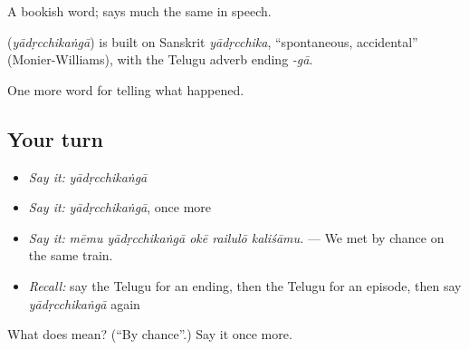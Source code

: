 A bookish word;  says much the same in speech.

\begin{cousinweb}
\textbf{} (\emph{yādṛcchikaṅgā}) is built on Sanskrit \emph{yādṛcchika}, \textquotedblleft{}spontaneous, accidental\textquotedblright{} (Monier-Williams), with the Telugu adverb ending \emph{-gā}.
\end{cousinweb}

\begin{grammarlens}[title={What you've built}]
One more word for telling what happened.
\end{grammarlens}

\subsection*{Your turn}
\begin{itemize}
\raggedright
  \item \emph{Say it:} \emph{yādṛcchikaṅgā}
  \item \emph{Say it:} \emph{yādṛcchikaṅgā}, once more
  \item \emph{Say it:} \emph{mēmu yādṛcchikaṅgā okē railulō kaliśāmu.} — We met by chance on the same train.
  \item \emph{Recall:} say the Telugu for an ending, then the Telugu for an episode, then say \emph{yādṛcchikaṅgā} again
\end{itemize}

\begin{tcolorbox}[breakable,colback=teal!4,colframe=teal!35!black,title={Before you move on}]
What does  mean? (\textquotedblleft{}By chance\textquotedblright{}.) Say it once more.
\end{tcolorbox}
